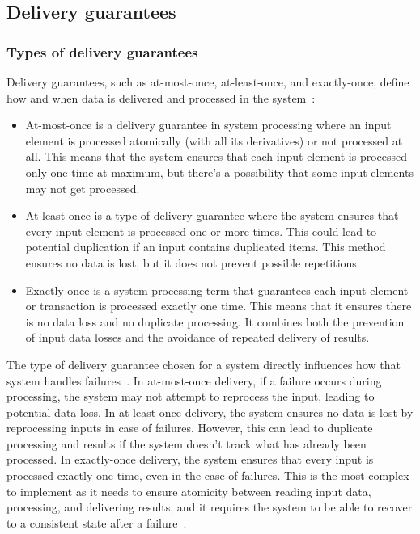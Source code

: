 \subsection{Delivery guarantees}
\label{delivery_guarantees}

\subsubsection{Types of delivery guarantees}

Delivery guarantees, such as at-most-once, at-least-once, and exactly-once, define how and when data is delivered and processed in the system~\cite{fragkoulis2024survey, carbone2018scalable, Akidau:2013:MFS:2536222.2536229}:
\begin{itemize}
    \item At-most-once is a delivery guarantee in system processing where an input element is processed atomically (with all its derivatives) or not processed at all. This means that the system ensures that each input element is processed only one time at maximum, but there's a possibility that some input elements may not get processed.
    \item At-least-once is a type of delivery guarantee where the system ensures that every input element is processed one or more times. This could lead to potential duplication if an input contains duplicated items. This method ensures no data is lost, but it does not prevent possible repetitions.
    \item Exactly-once is a system processing term that guarantees each input element or transaction is processed exactly one time. This means that it ensures there is no data loss and no duplicate processing. It combines both the prevention of input data losses and the avoidance of repeated delivery of results.
\end{itemize}

The type of delivery guarantee chosen for a system directly influences how that system handles failures~\cite{zhang2024survey, silvestre2021clonos, wang2021consistency}. In at-most-once delivery, if a failure occurs during processing, the system may not attempt to reprocess the input, leading to potential data loss. In at-least-once delivery, the system ensures no data is lost by reprocessing inputs in case of failures. However, this can lead to duplicate processing and results if the system doesn't track what has already been processed. In exactly-once delivery, the system ensures that every input is processed exactly one time, even in the case of failures. This is the most complex to implement as it needs to ensure atomicity between reading input data, processing, and delivering results, and it requires the system to be able to recover to a consistent state after a failure~\cite{Carbone:2017:SMA:3137765.3137777}.


